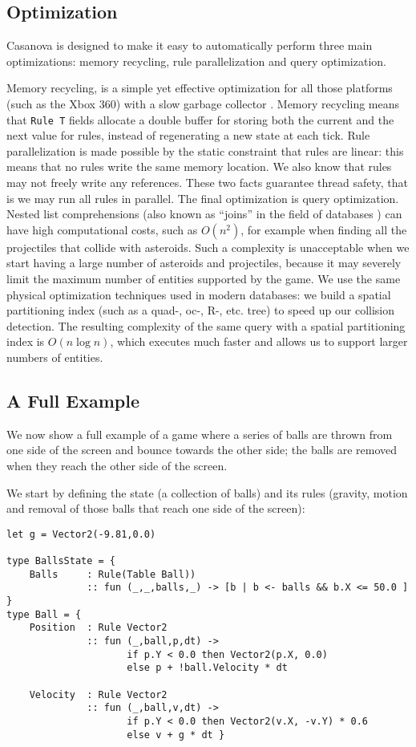\subsection{Optimization}

Casanova is designed to make it easy to automatically perform three main optimizations: memory recycling, rule parallelization and query optimization.

Memory recycling, is a simple yet effective optimization for all those platforms (such as the Xbox 360) with a slow garbage collector \cite{XBOX_GC}. Memory recycling means that \texttt{Rule T} fields allocate a double buffer for storing both the current and the next value for rules, instead of regenerating a new state at each tick.
Rule parallelization is made possible by the static constraint that rules are linear: this means that no rules write the same memory location. We also know that rules may not freely write any references. These two facts guarantee thread safety, that is we may run all rules in parallel. 
The final optimization is query optimization. Nested list comprehensions (also known as ``joins'' in the field of databases \cite{QUERY_OPT}) can have high computational costs, such as $O(n^2)$, for example when finding all the projectiles that collide with asteroids. Such a complexity is unacceptable when we start having a large number of asteroids and projectiles, because it may severely limit the maximum number of entities supported by the game.
We use the same physical optimization techniques used in modern databases: we build a spatial partitioning index (such as a quad-, oc-, R-, etc. tree) to speed up our collision detection. The resulting complexity of the same query with a spatial partitioning index is $O(n \log n)$, which executes much faster and allows us to support larger numbers of entities.


\subsection{A Full Example}

We now show a full example of a game where a series of balls are thrown from one side of the screen and bounce towards the other side; the balls are removed when they reach the other side of the screen.

We start by defining the state (a collection of balls) and its rules (gravity, motion and removal of those balls that reach one side of the screen):
\begin{lstlisting}
let g = Vector2(-9.81,0.0)

type BallsState = {
    Balls     : Rule(Table Ball))
              :: fun (_,_,balls,_) -> [b | b <- balls && b.X <= 50.0 ] }
type Ball = {
    Position  : Rule Vector2
              :: fun (_,ball,p,dt) ->
                     if p.Y < 0.0 then Vector2(p.X, 0.0) 
                     else p + !ball.Velocity * dt

    Velocity  : Rule Vector2
              :: fun (_,ball,v,dt) ->
                     if p.Y < 0.0 then Vector2(v.X, -v.Y) * 0.6 
                     else v + g * dt }
\end{lstlisting}

